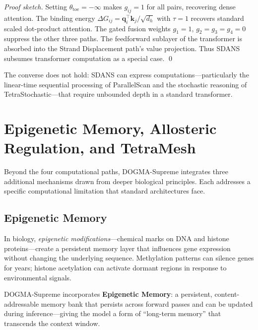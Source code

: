 \begin{proof}[Proof sketch]
Setting $\theta_{\mathrm{toe}} = -\infty$ makes $g_{ij} = 1$ for all pairs, recovering dense attention. The binding energy $\Delta G_{ij} = \mathbf{q}_i^\top \mathbf{k}_j / \sqrt{d_h}$ with $\tau = 1$ recovers standard scaled dot-product attention. The gated fusion weights $g_1 = 1$, $g_2 = g_3 = g_4 = 0$ suppress the other three paths. The feedforward sublayer of the transformer is absorbed into the Strand Displacement path's value projection. Thus SDANS subsumes transformer computation as a special case. \qed
\end{proof}

The converse does not hold: SDANS can express computations---particularly the linear-time sequential processing of ParallelScan and the stochastic reasoning of TetraStochastic---that require unbounded depth in a standard transformer.

\section{Epigenetic Memory, Allosteric Regulation, and TetraMesh}
\label{sec:advanced-features}

Beyond the four computational paths, DOGMA-Supreme integrates three additional mechanisms drawn from deeper biological principles. Each addresses a specific computational limitation that standard architectures face.

\subsection{Epigenetic Memory}
\label{sec:epigenetic-memory}

In biology, \emph{epigenetic modifications}---chemical marks on DNA and histone proteins---create a persistent memory layer that influences gene expression without changing the underlying sequence. Methylation patterns can silence genes for years; histone acetylation can activate dormant regions in response to environmental signals.

DOGMA-Supreme incorporates \textbf{Epigenetic Memory}: a persistent, content-addressable memory bank that persists across forward passes and can be updated during inference---giving the model a form of ``long-term memory'' that transcends the context window.


